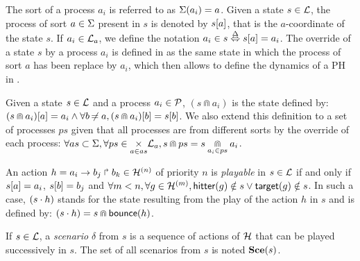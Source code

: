 \noindent
The sort of a process $a_i$ is referred to as $\Sigma(a_i) = a$.
Given a state $s\in \mathcal{L}$, the process of sort $a \in \Sigma$ present in $s$ is denoted by ${s[a]}$, that is the $a$-coordinate of the state $s$.
If $a_i \in \mathcal{L}_a$, we define the notation $a_i \in s \stackrel{\Delta}\Leftrightarrow {s[a]} = a_i$.
The override of a state $s$ by a process $a_i$ is defined in  as the same state in which the process of sort $a$ has been replace by $a_i$,
which then allows to define the dynamics of a PH in .
\begin{definition}[$\Cap : \PHl \times \PHproc \rightarrow \PHl$]
\label{def:statecap}
  Given a state $s \in \mathcal{L}$ and a process $a_i \in \mathcal{P}$, $(s \Cap a_i)$ is the state defined by:
  ${(s \Cap a_i)[a]} = a_i \wedge \forall b \not\nobreak\mkern -2mu = a, {(s \Cap a_i)[b]} = {s[b]}$.
  We also extend this definition to a set of processes $ps$ given that all processes are from different sorts by the override of each process:
  $\forall as \subset \Sigma, \forall ps \in \underset{a \in as}{\times} \mathcal{L}_a, s \Cap ps = s \underset{a_i \in ps}{\Cap} a_i$.
\end{definition}
\begin{definition}
\label{def:play}
  An action $h = a_i\rightarrow b_j\Rsh b_k \in \mathcal{H}^{(n)}$ of priority $n$ is \emph{playable} in $s \in \mathcal{L}$
  if and only if ${s[a]} = a_i$, ${s[b]} = b_j$ and $\forall m < n, \forall g \in \mathcal{H}^{(m)}, \mathsf{hitter}(g) \notin s \vee \mathsf{target}(g) \notin s$.
  In such a case, $(s \cdot h)$ stands for the state resulting from the play of the action $h$ in $s$ and is defined by: $(s \cdot h) = s \Cap \mathsf{bounce}(h)$.

  If $s \in \mathcal{L}$,
  a \emph{scenario} $\delta$ from $s$ is a sequence of actions of $\mathcal{H}$ that can be played successively in $s$.
  The set of all scenarios from $s$ is noted $\mathbf{Sce}(s)$.
\end{definition}

